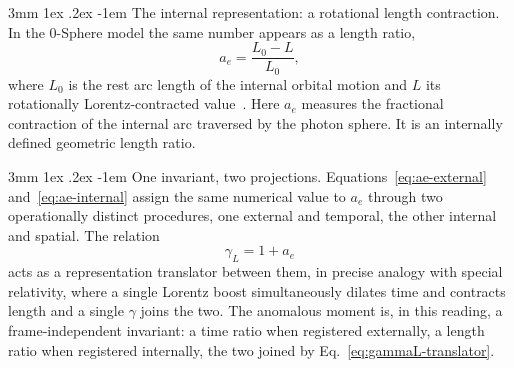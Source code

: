 \documentclass[%
 reprint, amsmath,amssymb, aps, prb, ]{revtex4-2}
\makeatletter
\numberwithin{equation}{section}
\renewcommand\paragraph{%
  \@startsection{paragraph}{4}{\z@}%
    {3mm \@plus 1ex \@minus .2ex}%
    {-1em}%
    {\normalfont\normalsize\itshape}}
\makeatother
\begin{document}
\paragraph{The internal representation: a rotational length contraction.}
In the 0-Sphere model the same number appears as a length ratio,
\begin{equation}
a_e = \frac{L_0 - L}{L_0},
\label{eq:ae-internal}
\end{equation}
where $L_0$ is the rest arc length of the internal orbital motion and $L$ its rotationally Lorentz-contracted value~\cite{hanamura10,hanamura47}. Here $a_e$ measures the fractional contraction of the internal arc traversed by the photon sphere. It is an internally defined geometric length ratio.

\paragraph{One invariant, two projections.}
Equations~\eqref{eq:ae-external} and~\eqref{eq:ae-internal} assign the same numerical value to $a_e$ through two operationally distinct procedures, one external and temporal, the other internal and spatial. The relation
\begin{equation}
\gamma_L = 1 + a_e
\label{eq:gammaL-translator}
\end{equation}
acts as a representation translator between them, in precise analogy with special relativity, where a single Lorentz boost simultaneously dilates time and contracts length and a single $\gamma$ joins the two. The anomalous moment is, in this reading, a frame-independent invariant: a time ratio when registered externally, a length ratio when registered internally, the two joined by Eq.~\eqref{eq:gammaL-translator}.
\end{document}

